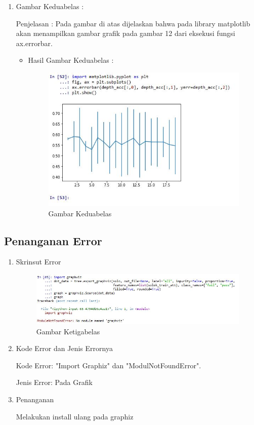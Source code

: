 \begin{enumerate}
\begin{itemize}
\begin{enumerate}
\begin{itemize}
\end{itemize}
\item  Gambar Keduabelas :
\par Penjelasan : Pada gambar di atas dijelaskan bahwa pada library matplotlib akan menampilkan gambar grafik pada gambar 12 dari eksekusi fungsi ax.errorbar.
\par 
\begin{itemize}
\par
\item Hasil  Gambar Keduabelas :

\begin{figure}[ht]
\centering
\includegraphics[scale=0.5]{figures/12.jpg}
\caption{ Gambar Keduabelas}
\label{12}
\end{figure}


\end{itemize}
\end{enumerate}

\end{itemize}

\subsection{Penanganan Error}
\begin{enumerate}
\item Skrinsut Error
\begin{figure}[ht]
\centering
\includegraphics[scale=0.5]{figures/6.jpg}
\caption{ Gambar Ketigabelas}
\label{6}
\end{figure}
\item Kode Error dan Jenis Errornya
\par Kode Error: "Import Graphiz" dan "ModulNotFoundError". 
\par Jenis Error: Pada Grafik
\item Penanganan
\par Melakukan install ulang pada graphiz


\end{enumerate}
\end{enumerate}
